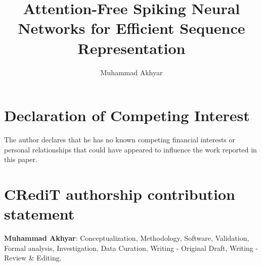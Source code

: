 \documentclass[preprint,12pt]{elsarticle}
\begin{document}
\begin{frontmatter}

\title{Attention-Free Spiking Neural Networks for Efficient Sequence Representation}

\author{Muhammad Akhyar}

\end{frontmatter}

\section*{Declaration of Competing Interest}
The author declares that he has no known competing financial interests or personal relationships that could have appeared to influence the work reported in this paper.

\section*{CRediT authorship contribution statement}
\textbf{Muhammad Akhyar}: Conceptualization, Methodology, Software, Validation, Formal analysis, Investigation, Data Curation, Writing - Original Draft, Writing - Review \& Editing.
\end{document}
